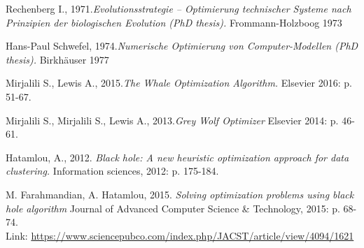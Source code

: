 \documentclass[border=0.2cm]{report}
\begin{document}
\begin{thebibliography}{9}

Rechenberg I., 1971.\textit{Evolutionsstrategie – Optimierung technischer Systeme nach Prinzipien der biologischen Evolution (PhD thesis).} Frommann-Holzboog 1973

Hans-Paul Schwefel, 1974.\textit{Numerische Optimierung von Computer-Modellen (PhD thesis).} Birkhäuser 1977

Mirjalili S., Lewis A., 2015.\textit{The Whale Optimization Algorithm.} Elsevier 2016: p. 51-67.

Mirjalili S., Mirjalili S., Lewis A., 2013.\textit{Grey Wolf Optimizer} Elsevier 2014: p. 46-61.

Hatamlou, A., 2012. \textit{Black hole: A new heuristic optimization approach for data clustering.} Information sciences, 2012: p. 175-184. 

M. Farahmandian, A. Hatamlou, 2015. \textit{Solving optimization problems using black hole algorithm} Journal of Advanced Computer Science \& Technology, 2015: p. 68-74. \\
Link: \url{https://www.sciencepubco.com/index.php/JACST/article/view/4094/1621}\\

\end{thebibliography}
\end{document}

